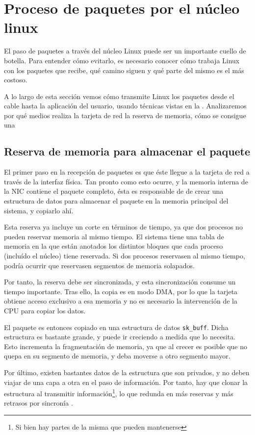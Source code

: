\section{Proceso de paquetes por el núcleo linux}
El paso de paquetes a través del núcleo Linux puede ser un importante cuello de botella. Para entender cómo evitarlo, 
es necesario conocer cómo trabaja Linux con los paquetes que recibe, qué camino siguen y qué parte del mismo es el más 
costoso.

A lo largo de esta sección vemos cómo transmite Linux los paquetes desde el cable hasta la aplicación del usuario, 
usando técnicas vistas en la . Analizaremos por qué medios realiza la tarjeta de red 
la reserva de memoria, cómo se consigue una 

\subsection{Reserva de memoria para almacenar el paquete}
El primer paso en la recepción de paquetes es que éste llegue a la tarjeta de red a través de la interfaz física. Tan 
pronto como esto ocurre, y la memoria interna de la \gls{NIC} contiene el paquete completo, ésta es responsable de 
de crear una estructura de datos para almacenar el paquete en la memoria principal del sistema, y copiarlo ahí.

Esta reserva ya incluye un corte en términos de tiempo, ya que dos procesos no pueden reservar memoria al mismo tiempo. 
El sistema tiene una tabla de memoria en la que están anotados los distintos bloques que cada proceso (incluído el 
núcleo) tiene reservada. Si dos procesos reservasen al mismo tiempo, podría ocurrir que reservasen segmentos de memoria 
solapados.

Por tanto, la reserva debe ser sincronizada, y esta sincronización consume un tiempo importante. Tras ello, la copia es 
en modo \gls{DMA}, por lo que la tarjeta obtiene acceso exclusivo a esa memoria y no es necesario la intervención de la 
CPU para copiar los datos.

El paquete es entonces copiado en una estructura de datos \texttt{sk\_buff}. Dicha estructura es bastante grande, y 
puede ir creciendo a medida que lo necesita. Esto incrementa la fragmentación de memoria, ya que al crecer es posible 
que no quepa en su segmento de memoria, y deba moverse a otro segmento mayor.

Por último, existen bastantes datos de la estructura que son privados, y no deben viajar de una capa a otra en el paso 
de información. Por tanto, hay que clonar la estructura al transmitir información\footnote{Si bien hay partes de la 
misma que pueden mantenerse}, lo que redunda en más reservas y más retrasos por sincronía
\cite{skBuffLinuxFoundation}.

